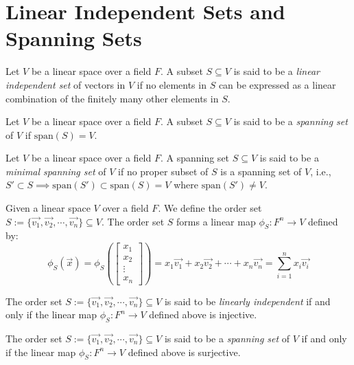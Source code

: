 \documentclass[
	11pt, %
	fleqn, %
	a4paper, %
]{LegrandOrangeBook}
\renewcommand{\span}[1]{\text{span}(#1)} %
\begin{document}
\newpage

\section{Linear Independent Sets and Spanning Sets}

\begin{definition}
    Let $V$ be a linear space over a field $F$. A subset $S \subseteq V$ is said to be a \emph{linear independent set} of vectors in $V$ if no elements in $S$ can be expressed as a linear combination of the finitely many other elements in $S$.
\end{definition}

\begin{definition}
    Let $V$ be a linear space over a field $F$. A subset $S \subseteq V$ is said to be a \emph{spanning set} of $V$ if $\span{S} = V$.
\end{definition}

\begin{definition}
    Let $V$ be a linear space over a field $F$. A spanning set $S \subseteq V$ is said to be a \emph{minimal spanning set} of $V$ if no proper subset of $S$ is a spanning set of $V$, i.e., $S' \subset S \implies \span{S'} \subset \span{S} = V$ where $\span{S'} \neq V$.
\end{definition}

Given a linear space $V$ over a field $F$. We define the order set $S := \{\vec{v_1}, \vec{v_2}, \cdots, \vec{v_n}\} \subseteq V$. The order set $S$ forms a linear map $\phi_S: F^n \to V$ defined by:
\[
    \phi_S(\vec{x}) = \phi_S\left(\begin{bmatrix}
        x_1 \\
        x_2 \\
        \vdots \\
        x_n
    \end{bmatrix}\right) = x_1 \vec{v_1} + x_2 \vec{v_2} + \cdots + x_n \vec{v_n} = \sum_{i=1}^{n} x_i \vec{v_i}
\]

\begin{proposition}
    The order set $S := \{\vec{v_1}, \vec{v_2}, \cdots, \vec{v_n}\} \subseteq V$ is said to be \emph{linearly independent} if and only if the linear map $\phi_S: F^n \to V$ defined above is injective.
\end{proposition}

\begin{proposition}
    The order set $S := \{\vec{v_1}, \vec{v_2}, \cdots, \vec{v_n}\} \subseteq V$ is said to be a \emph{spanning set} of $V$ if and only if the linear map $\phi_S: F^n \to V$ defined above is surjective.
\end{proposition}
\end{document}

